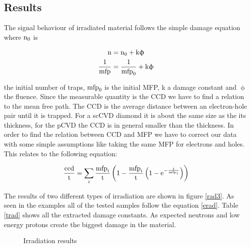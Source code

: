 
\subsection{Results}

The signal behaviour of irradiated material follows the simple damage equation where $\text{n}_0$ is

\begin{align}
	\z{n} 				&= \z{n}_0 + \z{k}\upphi\\
	\frac{1}{\z{mfp}}	&= \frac{1}{\z{mfp}_0} + \z{k}\upphi \label{erad}
\end{align}

\noindent
the initial number of traps, $\text{mfp}_0$ is the initial \ac{MFP}, k a damage constant and $\upphi$ the fluence. Since the measurable quantity is the \ac{CCD} we have to find a relation to the mean free path. The \ac{CCD} is the average distance between an electron-hole pair until it is trapped. For a \ac{sc}\ac{CVD} diamond it is about the same size as the its thickness, for the \ac{p}\ac{CVD} the \ac{CCD} is in general smaller than the thickness. In order to find the relation between \ac{CCD} and \ac{MFP} we have to correct our data with some simple assumptions like taking the same \ac{MFP} for electrons and holes. This relates to the following equation:
	
\begin{equation}
	\frac{\text{ccd}}{\text{t}} = \sum_i \frac{\text{mfp}_i}{\text{t}}\left(1-\frac{\text{mfp}_i}{\text{t}}\left(1-\text{e}^{-\frac{\text{t}}{\text{mfp}_i}}\right)\right)
\end{equation}

\noindent
The results of two different types of irradiation are shown in figure \vref{rad3}. As seen in the examples all of the tested samples follow the equation \vref{erad}. Table \vref{trad} shows all the extracted damage constants. As expected neutrons and low energy protons create the biggest damage in the material.

\begin{figure}
	\centering
	\caption{Irradiation results}
	\label{rad3}
\end{figure}

